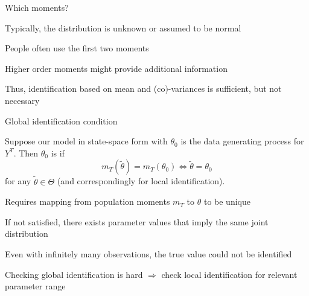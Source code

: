 \documentclass[handout,usepdftitle=false,xcolor=dvipsnames,aspectratio=169]{beamer}
\begin{document}
\begin{frame}{Which moments?}
  \begin{witemize}
    \item Typically, the distribution is unknown or assumed to be normal
    \item People often use the first two moments
    \item Higher order moments might provide additional information \parencite[see e.g.][]{FV2007}
    \item Thus, identification based on mean and (co)-variances is sufficient, but not necessary
  \end{witemize}
\end{frame}

\begin{frame}{Global identification condition}
  \begin{theorem}
    Suppose our model in state-space form with $\theta_0$ is the data generating process for $Y^T$. Then $\theta_0$ is  if
    \begin{equation}
      {m_T}\left( {\tilde \theta } \right) = {m_T}\left( {{\theta _0}} \right) \Leftrightarrow \tilde \theta  = {\theta _0}
    \end{equation}
    for any $\tilde \theta \in \Theta$ (and correspondingly for local identification).
  \end{theorem}
  \begin{witemize}
    \item Requires mapping from population moments ${m_T}$ to $\theta$ to be unique
    \item If not satisfied, there exists parameter values that imply the same joint distribution
    \item[$\Rightarrow$] Even with infinitely many observations, the true value could not be identified
    \item Checking global identification is hard $\Rightarrow$ check local identification for relevant parameter range
  \end{witemize}
\end{frame}
\end{document}

